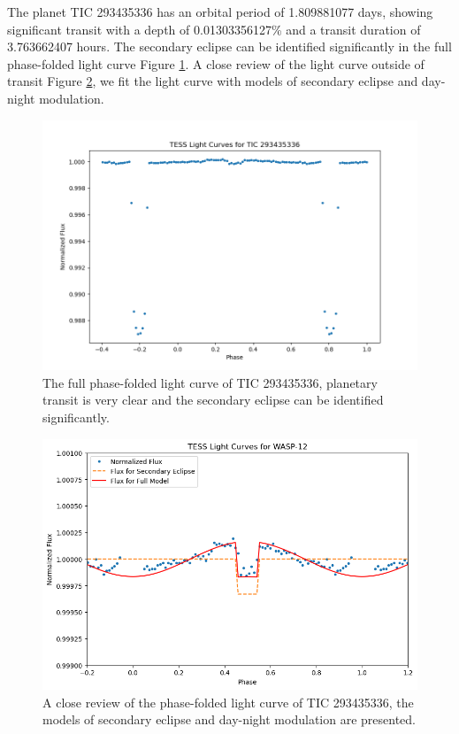 \documentclass{article}
\begin{document}
The planet TIC 293435336 has an orbital period of 1.809881077 days, showing significant transit with a depth of 0.01303356127\% and a transit duration of 3.763662407 hours. The secondary eclipse can be identified significantly in the full phase-folded light curve Figure \ref{fig:293435336_folded}. A close review of the light curve outside of transit Figure \ref{fig:293435336}, we fit the light curve with models of secondary eclipse and day-night modulation.\begin{figure}[H]\centering\includegraphics[width=0.7\linewidth]{image/293435336_folded.png}\captionsetup{font=small} \caption{The full phase-folded light curve of TIC 293435336, planetary transit is very clear and the secondary eclipse can be identified significantly.}\label{fig:293435336_folded}\end{figure}\begin{figure}[H]\centering\includegraphics[width=0.65\linewidth]{image/293435336.png}\captionsetup{font=small} \caption{A close review of the phase-folded light curve of TIC 293435336, the models of secondary eclipse and day-night modulation are presented.}\label{fig:293435336}\end{figure}
\newpage
\end{document}
